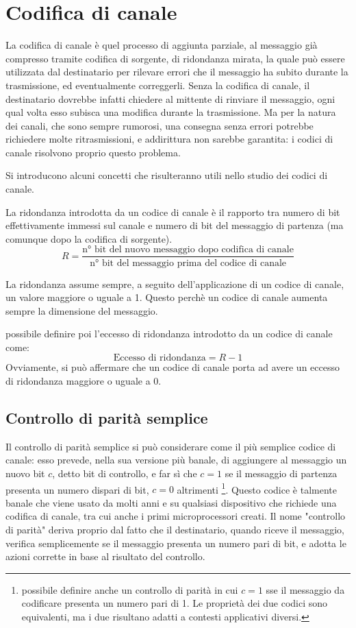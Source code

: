 \chapter{Codifica di canale}
La codifica di canale è quel processo di aggiunta parziale, al messaggio
già compresso tramite codifica di sorgente, di ridondanza mirata, la quale
può essere utilizzata dal destinatario per rilevare errori che il messaggio
ha subito durante la trasmissione, ed eventualmente correggerli.
Senza la codifica di canale, il destinatario dovrebbe infatti chiedere
al mittente di rinviare il messaggio, ogni qual volta esso subisca una modifica
durante la trasmissione. Ma per la natura dei canali, che sono sempre rumorosi,
una consegna senza errori potrebbe richiedere molte ritrasmissioni, e addirittura
non sarebbe garantita: i codici di canale risolvono proprio questo problema.

Si introducono alcuni concetti che risulteranno utili nello studio dei codici
di canale.
\begin{defn}
    La ridondanza introdotta da un codice di canale è il rapporto
    tra numero di bit effettivamente immessi sul canale e numero di bit
    del messaggio di partenza (ma comunque dopo la codifica di sorgente).
    \[
        R = \frac{\text{n° bit del nuovo messaggio dopo codifica di canale}}
                 {\text{n° bit del messaggio prima del codice di canale}}
    \]
\end{defn}
\begin{remark}
    La ridondanza assume sempre, a seguito dell'applicazione di un codice di canale,
    un valore maggiore o uguale a 1. Questo perchè un codice di canale aumenta
    sempre la dimensione del messaggio.
\end{remark}
\upperAccE possibile definire poi l'eccesso di ridondanza introdotto
da un codice di canale come:
\[
    \text{Eccesso di ridondanza} = R - 1
\]
Ovviamente, si può affermare che un codice di canale porta ad avere un
eccesso di ridondanza maggiore o uguale a 0.

\section{Controllo di parità semplice}
Il controllo di parità semplice si può considerare come il più semplice codice di canale:
esso prevede, nella sua versione più banale, di aggiungere al messaggio un nuovo bit $c$,
detto bit di controllo, e far sì che $c=1$ se il messaggio di partenza presenta un numero
dispari di bit, $c=0$ altrimenti \footnote{\upperAccE possibile
definire anche un controllo di parità in cui $c=1$ sse il messaggio da codificare
presenta un numero pari di 1. Le proprietà dei due codici sono equivalenti,
ma i due risultano adatti a contesti applicativi diversi.}.
Questo codice è talmente banale che viene usato da molti anni e su qualsiasi
dispositivo che richiede una codifica di canale, tra cui anche i primi
microprocessori creati.
Il nome "controllo di parità" deriva proprio dal fatto che il destinatario,
quando riceve il messaggio, verifica semplicemente se il messaggio presenta
un numero pari di bit, e adotta le azioni corrette in base al risultato del controllo.

